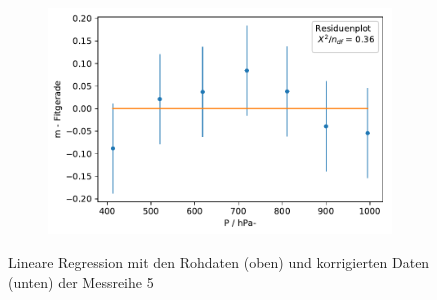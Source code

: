 \documentclass[12pt,a4paper]{article}
\begin{document}
\begin{figure}[H]
\begin{subfigure}{0.49\textwidth}
	\end{subfigure}
	\begin{subfigure}{0.49\textwidth}
		\centering
		\includegraphics[width=\textwidth]{Python/MR5_Residuen.pdf}
	\end{subfigure}
	\caption{Lineare Regression mit den Rohdaten (oben) und korrigierten Daten (unten) der Messreihe 5}
	\label{MR5_LinReg}
\end{figure}
\end{document}
